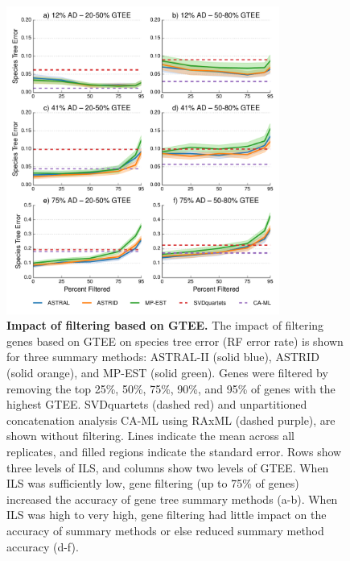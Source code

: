 \begin{figure}[!h]
\centering
\includegraphics[width=0.80\textwidth]{figures/gene-filtering-fig3.pdf}
\caption{{\bf Impact of filtering based on GTEE.} The impact of filtering genes based on GTEE on species tree error (RF error rate) is shown for three summary methods: ASTRAL-II (solid blue), ASTRID (solid orange), and MP-EST (solid green). 
Genes were filtered by removing the top 25\%, 50\%, 75\%, 90\%, and 95\% of genes with the highest GTEE. 
SVDquartets (dashed red) and unpartitioned concatenation analysis CA-ML using RAxML (dashed purple), are shown without filtering. 
Lines indicate the mean across all replicates, and filled regions indicate the standard error. 
Rows show three levels of ILS, and  columns show two levels of GTEE. 
When ILS was sufficiently low, gene filtering (up to 75\% of genes) increased the accuracy of gene tree summary methods (a-b). When ILS was high to very high, gene filtering had little impact on the accuracy of summary methods or else reduced summary method accuracy (d-f).}
\label{fig:include-3}
\end{figure}


